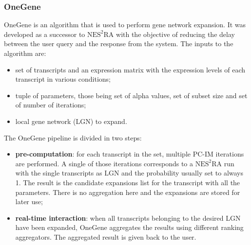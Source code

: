 \documentclass[journal]{IEEEtran}
\begin{document}
\subsubsection{OneGene}
OneGene is an algorithm that is used to perform gene network expansion. It was developed as a successor to $\text{NES}^{2}\text{RA}$ with the objective of reducing the delay between the user query and the response from the system. The inputs to the algorithm are:
\begin{itemize}
    \item set of transcripts and an expression matrix with the expression levels of each transcript in various conditions;
    \item tuple of parameters, those being set of alpha values, set of subset size and set of number of iterations;
    \item local gene network (LGN) to expand.
\end{itemize}
The OneGene pipeline is divided in two steps:
\begin{itemize}
    \item \textbf{pre-computation}: for each transcript in the set, multiple PC-IM iterations are performed. A single of those iterations corresponds to a $\text{NES}^{2}\text{RA}$ run with the single transcripts as LGN and the probability usually set to always 1. The result is the candidate expansions list for the transcript with all the parameters. There is no aggregation here and the expansions are stored for later use;
    \item \textbf{real-time interaction}: when all transcripts belonging to the desired LGN have been expanded, OneGene aggregates the results using different ranking aggregators. The aggregated result is given back to the user.
\end{itemize}
\end{document}
